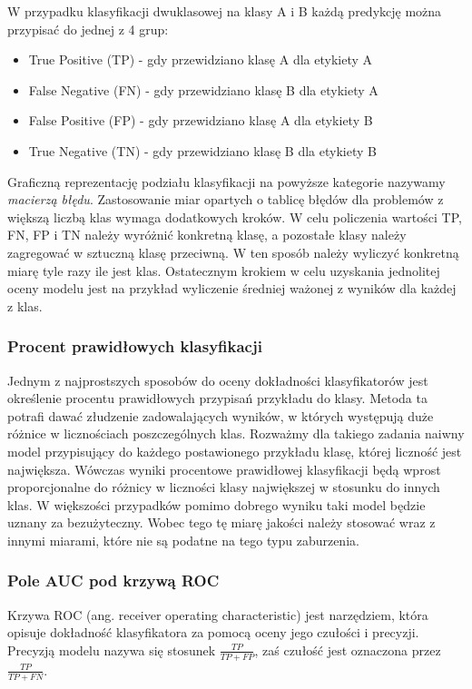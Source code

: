 \documentclass[a4paper, twoside, 11pt, openright]{article}
\begin{document}
W przypadku klasyfikacji dwuklasowej na klasy A i B każdą predykcję można przypisać do jednej z 4 grup:
\begin{itemize}
\item True Positive (TP) - gdy przewidziano klasę A dla etykiety A
\item False Negative (FN) - gdy przewidziano klasę B dla etykiety A
\item False Positive (FP) - gdy przewidziano klasę A dla etykiety B
\item True Negative (TN) - gdy przewidziano klasę B dla etykiety B
\end{itemize}

Graficzną reprezentację podziału klasyfikacji na powyższe kategorie nazywamy \textit{macierzą błędu}. Zastosowanie miar opartych o tablicę błędów dla problemów z większą liczbą klas wymaga dodatkowych kroków. W celu policzenia wartości TP, FN, FP i TN należy wyróżnić konkretną klasę, a pozostałe klasy należy zagregować w sztuczną klasę przeciwną. W ten sposób należy wyliczyć konkretną miarę tyle razy ile jest klas. Ostatecznym krokiem w celu uzyskania jednolitej oceny modelu jest na przykład wyliczenie średniej ważonej z wyników dla każdej z klas.


\subsubsection{Procent prawidłowych klasyfikacji}

Jednym z najprostszych sposobów do oceny dokładności klasyfikatorów jest określenie procentu prawidłowych przypisań przykładu do klasy. Metoda ta potrafi dawać złudzenie zadowalających wyników, w których występują duże różnice w licznościach poszczególnych klas. Rozważmy dla takiego zadania naiwny model przypisujący do każdego postawionego przykładu klasę, której liczność jest największa. Wówczas wyniki procentowe prawidłowej klasyfikacji będą wprost proporcjonalne do różnicy w liczności klasy największej w stosunku do innych klas. W większości przypadków pomimo dobrego wyniku taki model będzie uznany za bezużyteczny. Wobec tego tę miarę jakości należy stosować wraz z innymi miarami, które nie są podatne na tego typu zaburzenia.

\subsubsection{Pole AUC pod krzywą ROC \cite{roc}}

Krzywa ROC (ang. receiver operating characteristic) jest narzędziem, która opisuje dokładność klasyfikatora za pomocą oceny jego czułości i precyzji. Precyzją modelu nazywa się stosunek $\frac{TP}{TP+FP}$, zaś czułość jest oznaczona przez $\frac{TP}{TP+FN}$.
\end{document}

